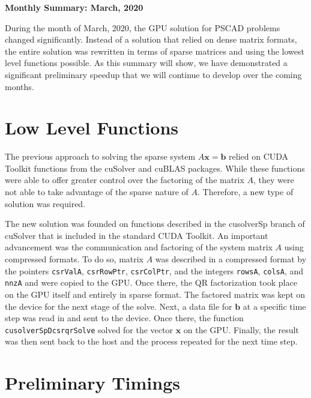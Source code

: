 \documentclass[11pt,letterpaper]{article}
\begin{document}
\begin{center}
    {\Large \bf Monthly Summary: March, 2020}
\end{center}

During the month of March, 2020, the GPU solution for PSCAD problems changed significantly. Instead of a solution that relied on dense matrix formats, the entire solution was rewritten in terms of sparse matrices and using the lowest level functions possible. As this summary will show, we have demonstrated a significant preliminary speedup that we will continue to develop over the coming months.


\section*{Low Level Functions}
The previous approach to solving the sparse system $A{\mathbf x} = {\mathbf b}$ relied on CUDA Toolkit functions from the cuSolver and cuBLAS packages. While these functions were able to offer greater control over the factoring of the matrix $A$, they were not able to take advantage of the sparse nature of $A$. Therefore, a new type of solution was required.

The new solution was founded on functions described in the cusolverSp branch of cuSolver that is included in the standard CUDA Toolkit. An important advancement was the communication and factoring of the system matrix $A$ using compressed formats. To do so, matrix $A$ was described in a compressed format by the pointers \texttt{csrValA}, \texttt{csrRowPtr}, \texttt{csrColPtr}, and the integers \texttt{rowsA}, \texttt{colsA}, and \texttt{nnzA} and were copied to the GPU. Once there, the QR factorization took place on the GPU itself and entirely in sparse format. The factored matrix was kept on the device for the next stage of the solve. Next, a data file for ${\mathbf b}$ at a specific time step was read in and sent to the device. Once there, the function \texttt{cusolverSpDcsrqrSolve} solved for the vector $\mathbf{x}$ on the GPU. Finally, the result was then sent back to the host and the process repeated for the next time step.


\section*{Preliminary Timings}
\end{document}
